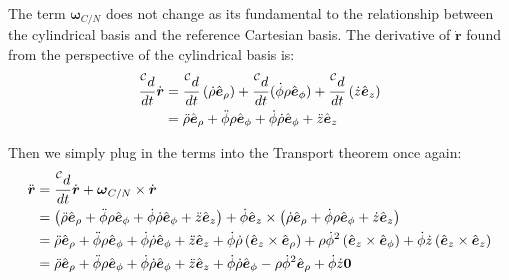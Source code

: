 \documentclass[titlepage]{article}
\begin{document}
The term $\boldsymbol{\omega}_{C/N}$ does not change as its fundamental to the relationship between the cylindrical basis and the reference Cartesian basis. The derivative of $\dot{\boldsymbol{r}}$ found from the perspective of the cylindrical basis is:
\begin{equation}
	\begin{split}
		\frac{\prescript{\mathcal{C}}{}{d}}{dt}\dot{\boldsymbol{r}}&=\frac{\prescript{\mathcal{C}}{}{d}}{dt}\left(\dot{\rho}\hat{\boldsymbol{e}}_{\rho}\right)+\frac{\prescript{\mathcal{C}}{}{d}}{dt}(\dot{\phi}\rho\hat{\boldsymbol{e}}_{\phi})+\frac{\prescript{\mathcal{C}}{}{d}}{dt}\left(\dot{z}\hat{\boldsymbol{e}}_z\right)\\
		&=\ddot{\rho}\hat{\boldsymbol{e}}_{\rho}+\ddot{\phi}\rho\hat{\boldsymbol{e}}_{\phi}+\dot{\phi}\dot{\rho}\hat{\boldsymbol{e}}_{\phi}+\ddot{z}\hat{\boldsymbol{e}}_z\\
	\end{split}
\end{equation}

Then we simply plug in the terms into the Transport theorem once again:
\begin{equation}
	\begin{split}
		\ddot{\boldsymbol{r}}&=\frac{\prescript{\mathcal{C}}{}{d}}{dt}\dot{\boldsymbol{r}}+\boldsymbol{\omega}_{C/N}\times\dot{\boldsymbol{r}}\\
		&=\left(\ddot{\rho}\hat{\boldsymbol{e}}_{\rho}+\ddot{\phi}\rho\hat{\boldsymbol{e}}_{\phi}+\dot{\phi}\dot{\rho}\hat{\boldsymbol{e}}_{\phi}+\ddot{z}\hat{\boldsymbol{e}}_z\right)+\dot{\phi}\hat{\boldsymbol{e}}_z\times\left(\dot{\rho}\hat{\boldsymbol{e}}_{\rho}+\dot{\phi}\rho\hat{\boldsymbol{e}}_{\phi}+\dot{z}\hat{\boldsymbol{e}}_z\right)\\
		&=\ddot{\rho}\hat{\boldsymbol{e}}_{\rho}+\ddot{\phi}\rho\hat{\boldsymbol{e}}_{\phi}+\dot{\phi}\dot{\rho}\hat{\boldsymbol{e}}_{\phi}+\ddot{z}\hat{\boldsymbol{e}}_z+\dot{\phi}\dot{\rho}\left(\hat{\boldsymbol{e}}_z\times\hat{\boldsymbol{e}}_{\rho}\right)+\rho\dot{\phi}^2\left(\hat{\boldsymbol{e}}_z\times\hat{\boldsymbol{e}}_{\phi}\right)+\dot{\phi}\dot{z}\left(\hat{\boldsymbol{e}}_z\times\hat{\boldsymbol{e}}_{z}\right)\\
		&=\ddot{\rho}\hat{\boldsymbol{e}}_{\rho}+\ddot{\phi}\rho\hat{\boldsymbol{e}}_{\phi}+\dot{\phi}\dot{\rho}\hat{\boldsymbol{e}}_{\phi}+\ddot{z}\hat{\boldsymbol{e}}_z+\dot{\phi}\dot{\rho}\hat{\boldsymbol{e}}_{\phi}-\rho\dot{\phi}^2\hat{\boldsymbol{e}}_{\rho}+\dot{\phi}\dot{z}\boldsymbol{0}
	\end{split}
\end{equation}
\end{document}

